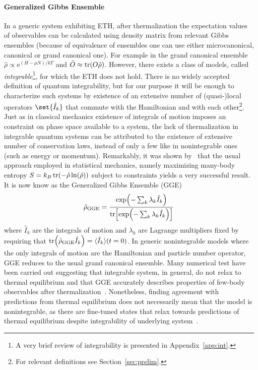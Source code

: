 \paragraph{Generalized Gibbs Ensemble}In a generic system exhibiting ETH, after thermalization the expectation values
of observables can be calculated using density matrix from relevant Gibbs ensembles
(because of equivalence of ensembles one can use either microcanonical, canonical or
grand canonical one).
For example in the grand canonical ensemble \(\hat{\rho} \propto \mathrm{e}^{(H-\mu N)/kT}\)
and \(\bar{O}\approx \tr(O \hat{\rho})\).
However, there exists a class of models, called \textit{integrable}\footnote{A very brief review of integrability is presented in Appendix~\ref{app:int}.},
for which the ETH does not hold. There is no widely accepted definition of quantum
integrability, but for our purpose it will be enough to characterize such systems by
existence of an extensive number of (quasi-)local operators \(\set{\hat{I}_k}\) that commute with
the Hamiltonian and with each  other\footnote{For relevant definitions see Section~\ref{sec:prelim}.}.
Just as in classical mechanics existence of integrals of motion imposes an constraint on phase
space available to a system, the lack of thermalization in integrable quantum systems can be
attributed to the existence of extensive number of conservation laws, instead of only a few like
in nonintegrable ones (such as energy or momentum). Remarkably, it was shown by~\textcite{Rigol2007}
that the usual approach employed in statistical mechanics, namely maximizing many-body entropy
\(S = k_B \tr(-\hat{\rho}\ln(\hat{\rho}))\) subject to constraints yields a very successful result.
It is now know as the Generalized Gibbs Ensemble (GGE)
\begin{equation}
    \hat{\rho}_{\mathrm{GGE}} = \frac{\exp({-\sum_k \lambda_k \hat{I}_k})}{
        \tr[\exp({-\sum_k \lambda_k \hat{I}_k})]}  
\end{equation}
where \(\hat{I}_k\) are the integrals of motion and \(\lambda_k\) are Lagrange multipliers fixed
by requiring that \(\tr(\hat{\rho}_{\mathrm{GGE}}\hat{I}_k) = \langle \hat{I}_k\rangle(t=0)\).
In generic nonintegrable models where the only integrals of motion are the Hamiltonian and
particle number operator, GGE reduces to the usual grand canonical ensemble. 
Many numerical test have been carried out suggesting that integrable system, in general, do not
relax to thermal equilibrium and that GGE accurately describes properties of few-body
 observables after thermalization~\autocite{Cassidy2011,Rigol2007,Vidmar2016,Cazalilla2006}.
Nonetheless, finding agreement with predictions from thermal equilibrium does not necessarily
mean that the model is nonintegrable, as there are fine-tuned states that relax towards
predictions of thermal equilibrium despite integrability of underlying 
system~\autocite{Rigol2012,Rigol2011a,He2012}. 

